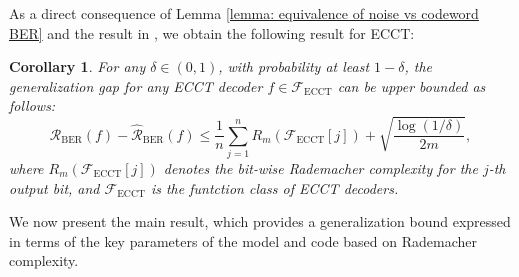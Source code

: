\documentclass[lettersize,onecolumn]{IEEEtran}
\newtheorem{corollary}{Corollary}
\begin{document}
As a direct consequence of Lemma \ref{lemma: equivalence of noise vs codeword BER} and the result in \cite[Prop.~1]{adiga2024generalizationboundforNBP}, we obtain the following result for ECCT:

\begin{corollary}\label{prop: ECCT generalization bound vs bit-wise Rad complexity}
    For any $ \delta \in (0, 1)$, with probability at least $1-\delta$, the generalization gap for any ECCT decoder $f \in \mathcal{F}_{\text{ECCT}}$ can be upper bounded as follows:
    \begin{equation}
        \mathcal{R}_{\mathrm{BER}}(f)-\hat{\mathcal{R}}_{\mathrm{BER}}(f) \leq \frac{1}{n} \sum_{j=1}^{n} R_{m}\left(\mathcal{F}_{\text{ECCT}}[j]\right)+\sqrt{\frac{\log (1 / \delta)}{2 m}},
        \label{eq: generalization bound via Rademacher(ECCT)}
    \end{equation}
    where $R_{m}\left(\mathcal{F}_{\text{ECCT}}[j]\right)$ denotes the bit-wise Rademacher complexity for the $j$-th output bit, and $\mathcal{F}_{\text{ECCT}}$ is the funtction class of ECCT decoders.
\end{corollary}


We now present the main result, which provides a generalization bound expressed in terms of the key parameters of the model and code based on Rademacher complexity.
\end{document}
